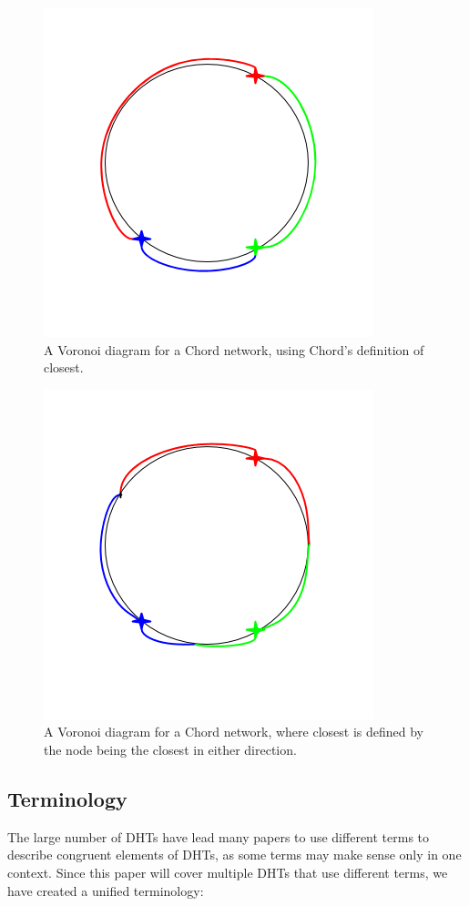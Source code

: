 \begin{figure}
	\centering
	\includegraphics[width=0.5\linewidth]{figs/voro-chord-normal}
	\caption{A Voronoi diagram for a Chord network, using Chord's definition of closest.}
	\label{fig:voro-chord-normal}
\end{figure}

\begin{figure}
	\centering
	\includegraphics[width=0.5\linewidth]{figs/voro-chord-alternative}
	\caption{A Voronoi diagram for a Chord network, where closest is defined by the node being the closest in either direction.}
	\label{fig:voro-chord-alternative}
\end{figure}

 
\subsection{Terminology}
The large number of DHTs have lead many papers to use different terms to describe congruent elements of DHTs, as some terms may make sense only in one context.
Since this paper will cover multiple DHTs that use different terms, we have created a unified terminology:


